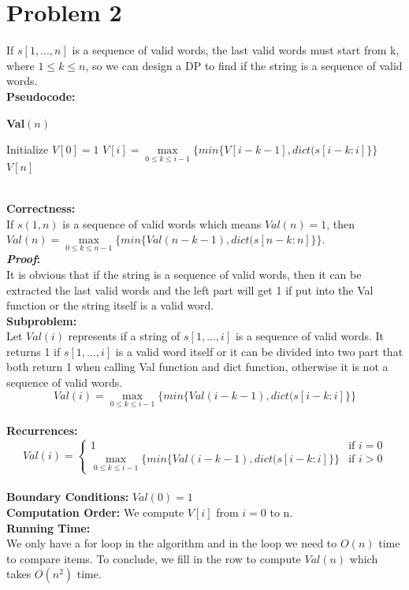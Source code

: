 \documentclass[twoside]{homework}
\begin{document}
\section*{Problem 2}
If $s[1,...,n]$ is a sequence of valid words, the last valid words must start from k, where $1\le k\le n$, so we can design a DP to find if the string is a sequence of valid words.
\\\textbf{Pseudocode:} \quad
\begin{algorithm}
	\caption*{\textbf{Val$(n)$}}
	\begin{algorithmic}
		\STATE Initialize $V[0]=1$
		\STATE $V[i]=\max \limits_{0\le k\le i-1}\{min\{V[i-k-1],dict(s[i-k:i]\}\}$
		\ENDFOR
		\RETURN $V[n]$
	\end{algorithmic}		
\end{algorithm}
\\\textbf{Correctness:} 
\\If $s(1,n)$ is a sequence of valid words which means $Val(n)=1$, then $Val(n)=\max \limits_{0\le k\le n-1}\{min\{Val(n-k-1),dict(s[n-k:n]\}\}$. 
\\\textbf{\emph{Proof}:}
\\It is obvious that if the string is a sequence of valid words, then it can be extracted the last valid words and the left part will get 1 if put into the Val function or the string itself is a valid word.
\\\textbf{Subproblem:} 
\\Let $Val(i)$ represents if a string of $s[1,...,i]$ is a sequence of valid words. It returns 1 if $s[1,...,i]$ is a valid word itself or it can be divided into two part that both return 1 when calling Val function and dict function, otherwise it is not a sequence of valid words. 
$$Val(i)=\max \limits_{0\le k\le i-1}\{min\{Val(i-k-1),dict(s[i-k:i]\}\}$$
\\\textbf{Recurrences:} 
$$Val(i)= \begin{cases}
1 & \text{if $i=0$}\\
\max \limits_{0\le k\le i-1}\{min\{Val(i-k-1),dict(s[i-k:i]\}\} & \text{if $i>0$}
\end{cases}$$
\\\textbf{Boundary Conditions:} 
$Val(0)=1$ 
\\\textbf{Computation Order:} 
We compute $V[i]$ from $i=0$ to n.
\\\textbf{Running Time:} \quad
\\We only have a for loop in the algorithm and in the loop we need to $O(n)$ time to compare items. To conclude, we fill in the row to compute $Val(n)$ which takes $O(n^2)$ time.
\end{document}
